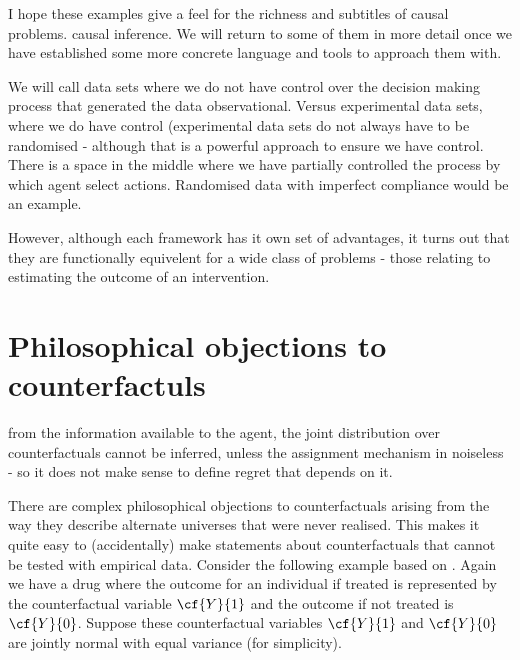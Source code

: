 I hope these examples give a feel for the richness and subtitles of causal problems. causal inference. We will return to some of them in more detail once we have established some more concrete language and tools to approach them with.


We will call data sets where we do not have control over the decision making process that generated the data observational. Versus experimental data sets, where we do have control (experimental data sets do not always have to be randomised - although that is a powerful approach to ensure we have control. There is a space in the middle where we have partially controlled the process by which agent select actions. Randomised data with imperfect compliance would be an example.

However, although each framework has it own set of advantages, it turns out that they are functionally equivelent for a wide class of problems - those relating to estimating the outcome of an intervention. 


\section{Philosophical objections to counterfactuls}
from the information available to the agent, the joint distribution over counterfactuals cannot be inferred, unless the assignment mechanism in noiseless - so it does not make sense to define regret that depends on it. 


There are complex philosophical objections to counterfactuals arising from the way they describe alternate universes that were never realised. This makes it quite easy to (accidentally) make statements about counterfactuals that cannot be tested with empirical data. Consider the following example based on \citet{Dawid2000}. Again we have a drug where the outcome for an individual if treated is represented by the counterfactual variable $\cf{Y}{1}$ and the outcome if not treated is $\cf{Y}{0}$. Suppose these counterfactual variables $\cf{Y}{1}$ and $\cf{Y}{0}$ are jointly normal with equal variance (for simplicity).


